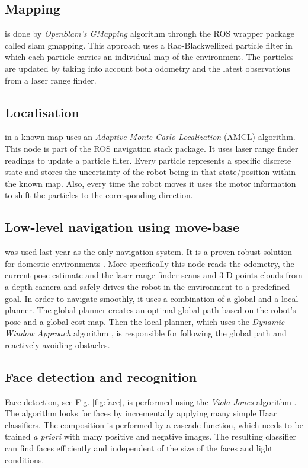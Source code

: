 \subsection{Mapping} is done by \textit{OpenSlam's GMapping} algorithm \cite{slam} through the ROS wrapper package called \textsf{slam gmapping}. This approach uses a Rao-Blackwellized particle filter in which each particle carries an individual map of the environment. The particles are updated by taking into account both odometry and the latest observations from a laser range finder.

\subsection{Localisation} in a known map uses an \textit{Adaptive Monte Carlo Localization} (AMCL)\cite{amcl} algorithm. This node is part of the ROS \textsf{navigation stack} package. It uses laser range finder readings to update a particle filter. Every particle represents a specific discrete state and stores the uncertainty of the robot being in that state/position within the known map. Also, every time the robot moves it uses the motor information to shift the particles to the corresponding direction.

\subsection{Low-level navigation using move-base} was used last year as the only navigation system. It is a proven robust solution for domestic environments \cite{Marder-Eppstein2010}. More specifically this node reads the odometry, the current pose estimate and the laser range finder scans and 3-D points clouds from a depth camera and safely drives the robot in the environment to a predefined goal. In order to navigate smoothly, it uses a combination of a global and a local planner. The global planner creates an optimal global path based on the robot's pose and a global cost-map. Then the local planner, which uses the \textit{Dynamic Window Approach} algorithm \cite{dwa}, is responsible for following the global path and reactively avoiding obstacles. 

\subsection{\label{sec:vision}Face detection and recognition}

Face detection, see Fig. \ref{fig:face}, is performed using the \textit{Viola-Jones} algorithm \cite{Viola01_RapidObjDet}. The algorithm looks for faces by incrementally applying many simple Haar classifiers. The composition is performed by a cascade function, which needs to be trained \textit{a priori} with many positive and negative images. The resulting classifier can find faces efficiently and independent of the size of the faces and light conditions.

